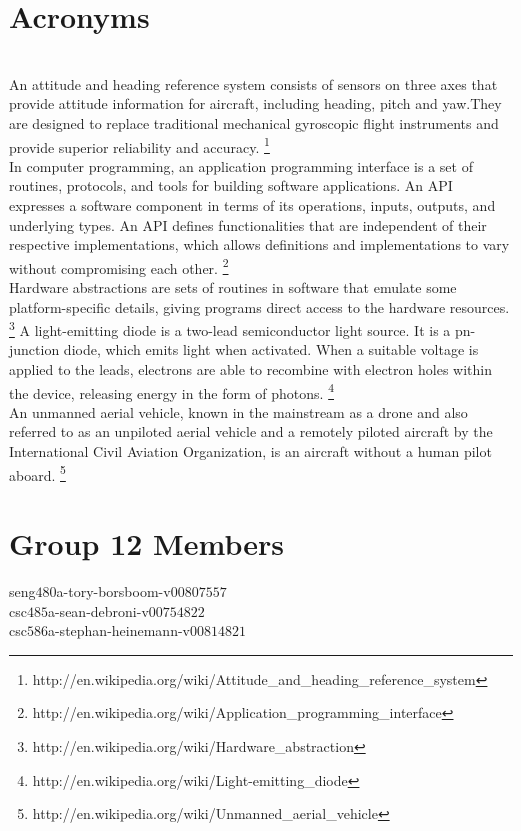 \clearpage
\section{Acronyms}
\label{acronyms}

\begin{acronym}
	\\
		An attitude and heading reference system consists of sensors on
		three axes that provide attitude information for aircraft, including
		heading, pitch and yaw.They are designed to replace traditional
		mechanical gyroscopic flight instruments and provide superior
		reliability and accuracy.
		\footnote{http://en.wikipedia.org/wiki/Attitude\_and\_heading\_reference\_system}
	\\
		In computer programming, an application programming interface is a set
		of routines, protocols, and tools for building software applications.
		An API expresses a software component in terms of its operations,
		inputs, outputs, and underlying types. An API defines functionalities
		that are independent of their respective implementations, which allows
		definitions and implementations to vary without compromising each
		other.
		\footnote{http://en.wikipedia.org/wiki/Application\_programming\_interface}
	\\
		Hardware abstractions are sets of routines in software that emulate
		some platform-specific details, giving programs direct access to the
		hardware resources.
		\footnote{http://en.wikipedia.org/wiki/Hardware\_abstraction}
		A light-emitting diode is a two-lead semiconductor light source. It is
		a pn-junction diode, which emits light when activated. When a suitable
		voltage is applied to the leads, electrons are able to recombine with
		electron holes within the device, releasing energy in the form of
		photons.
		\footnote{http://en.wikipedia.org/wiki/Light-emitting\_diode}
	\\
		An unmanned aerial vehicle, known in the mainstream as a drone and also
		referred to as an unpiloted aerial vehicle and a remotely piloted
		aircraft by the International Civil Aviation Organization, is an
		aircraft without a human pilot aboard.
		\footnote{http://en.wikipedia.org/wiki/Unmanned\_aerial\_vehicle}
\end{acronym}

\section{Group 12 Members}
\label{sec:group_members}
\par
seng$480$a-tory-borsboom-v$00807557$\\
csc$485$a-sean-debroni-v$00754822$\\
csc$586$a-stephan-heinemann-v$00814821$\\
